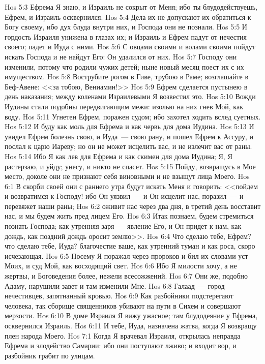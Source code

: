 \vs Hos 5:3 Ефрема Я знаю, и Израиль не сокрыт от Меня; ибо ты блудодействуешь, Ефрем, и Израиль осквернился.
\vs Hos 5:4 Дела их не допускают их обратиться к Богу своему, ибо дух блуда внутри них, и Господа они не познали.
\vs Hos 5:5 И гордость Израиля унижена в глазах их; и Израиль и Ефрем падут от нечестия своего; падет и Иуда с ними.
\vs Hos 5:6 С овцами своими и волами своими пойдут искать Господа и не найдут Его: Он удалился от них.
\vs Hos 5:7 Господу они изменили, потому что родили чужих детей; ныне новый месяц поест их с их имуществом.
\vs Hos 5:8 Вострубите рогом в Гиве, трубою в Раме; возглашайте в Беф-Авене: <<за тобою, Вениамин!>>
\vs Hos 5:9 Ефрем сделается пустынею в день наказания; между коленами Израилевыми Я возвестил это.
\vs Hos 5:10 Вожди Иудины стали подобны передвигающим межи: изолью на них гнев Мой, как воду.
\vs Hos 5:11 Угнетен Ефрем, поражен судом; ибо захотел ходить вслед суетных.
\vs Hos 5:12 И буду как моль для Ефрема и как червь для дома Иудина.
\vs Hos 5:13 И увидел Ефрем болезнь свою, и Иуда~--- свою рану, и пошел Ефрем к Ассуру, и послал к царю Иареву; но он не может исцелить вас, и не излечит вас от раны.
\vs Hos 5:14 Ибо Я как лев для Ефрема и как скимен для дома Иудина; Я, Я растерзаю, и уйду; унесу, и никто не спасет.
\vs Hos 5:15 Пойду, возвращусь в Мое место, доколе они не признают себя виновными и не взыщут лица Моего.
\vs Hos 6:1 В скорби своей они с раннего утра будут искать Меня и говорить: <<пойдем и возвратимся к Господу! ибо Он уязвил~--- и Он исцелит нас, поразил~--- и перевяжет наши раны;
\vs Hos 6:2 оживит нас через два дня, в третий день восставит нас, и мы будем жить пред лицем Его.
\vs Hos 6:3 Итак познаем, будем стремиться познать Господа; как утренняя заря~--- явление Его, и Он придет к нам, как дождь, как поздний дождь оросит землю>>.
\vs Hos 6:4 Что сделаю тебе, Ефрем? что сделаю тебе, Иуда? благочестие ваше, как утренний туман и как роса, скоро исчезающая.
\vs Hos 6:5 Посему Я поражал через пророков и бил их словами уст Моих, и суд Мой, как восходящий свет.
\vs Hos 6:6 Ибо Я милости хочу, а не жертвы, и Боговедения более, нежели всесожжений.
\vs Hos 6:7 Они же, подобно Адаму, нарушили завет и там изменили Мне.
\vs Hos 6:8 Галаад~--- город нечестивцев, запятнанный кровью.
\vs Hos 6:9 Как разбойники подстерегают человека, так сборище священников убивают на пути в Сихем и совершают мерзости.
\vs Hos 6:10 В доме Израиля Я вижу ужасное; там блудодеяние у Ефрема, осквернился Израиль.
\vs Hos 6:11 И тебе, Иуда, назначена жатва, когда Я возвращу плен народа Моего.
\vs Hos 7:1 Когда Я врачевал Израиля, открылась неправда Ефрема и злодейство Самарии: ибо они поступают лживо; и входит вор, и разбойник грабит по улицам.
